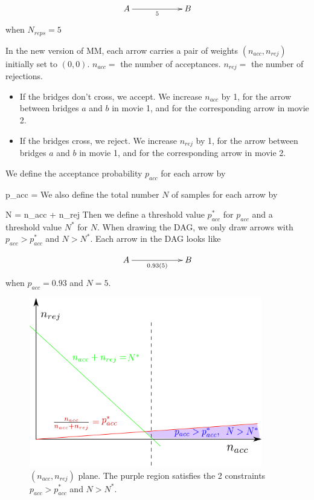\documentclass[12pt]{article}
\begin{document}
$$\xymatrix@C=5pc{A\ar[r]_5&B}$$
when $N_{reps} =5$


In the new version of MM, 
each arrow carries a pair of weights $(n_{acc}, n_{rej})$ initially set to $(0,0)$.
$n_{acc}=$ the number of acceptances.
$n_{rej}=$ the number of rejections. 

\begin{itemize}
\item If the bridges don't
cross, we accept. We increase $n_{acc}$ by 1, for the arrow between bridges $a$ and $b$ in movie 1,
and for the corresponding arrow in movie 2. 
\item
If the bridges cross, we reject. We increase $n_{rej}$ by 1, for the arrow between bridges $a$ and $b$ in movie 1,
and for the corresponding arrow in movie 2. 
\end{itemize}

We define the acceptance probability $p_{acc}$ 
for each arrow by

\beq
p_{acc} = 
\eeq
We also define the total number $N$ of samples for each arrow by

\beq
N = n_{acc} + n_{rej}
\eeq
Then we  define a threshold value $p^*_{acc}$ 
for $p_{acc}$ and a threshold value $N^*$
for $N$. When drawing the DAG, we only draw arrows with $p_{acc}>p^*_{acc}$
and $N> N^*$. Each arrow in the DAG looks like 

$$\xymatrix@C=5pc{A\ar[r]_{0.93 (5)}&B}$$
when $p_{acc} =0.93$ and $N= 5$.

\begin{figure}[h!]
\centering
\includegraphics[width=4in]
{nacc-nrej-plane.png}
\caption{
$(n_{acc}, n_{rej})$ plane. The purple region satisfies the 
2 constraints $p_{acc} > p_{acc}^*$ and $N> N^*$.}
\label{fig-nacc-nrej-plane}
\end{figure}
\end{document}
